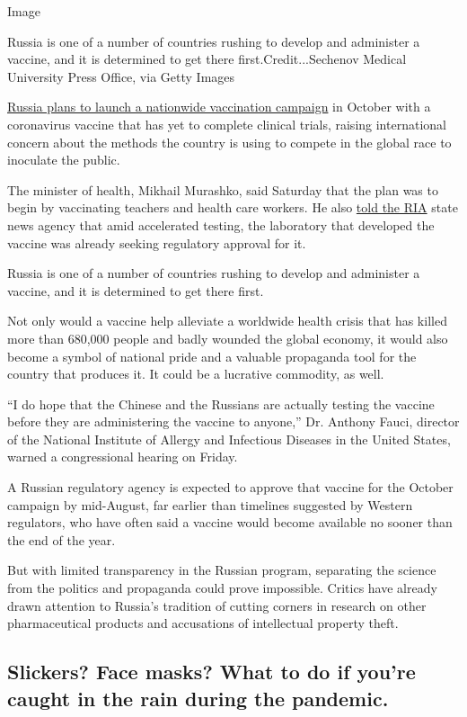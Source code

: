 Image

Russia is one of a number of countries rushing to develop and administer
a vaccine, and it is determined to get there first.Credit...Sechenov
Medical University Press Office, via Getty Images

\href{https://www.nytimes.com/2020/08/02/world/europe/russia-trials-vaccine-October.html}{Russia
plans to launch a nationwide vaccination campaign} in October with a
coronavirus vaccine that has yet to complete clinical trials, raising
international concern about the methods the country is using to compete
in the global race to inoculate the public.

The minister of health, Mikhail Murashko, said Saturday that the plan
was to begin by vaccinating teachers and health care workers. He also
\href{https://ria.ru/20200801/1575248763.html}{told the RIA} state news
agency that amid accelerated testing, the laboratory that developed the
vaccine was already seeking regulatory approval for it.

Russia is one of a number of countries rushing to develop and administer
a vaccine, and it is determined to get there first.

Not only would a vaccine help alleviate a worldwide health crisis that
has killed more than 680,000 people and badly wounded the global
economy, it would also become a symbol of national pride and a valuable
propaganda tool for the country that produces it. It could be a
lucrative commodity, as well.

``I do hope that the Chinese and the Russians are actually testing the
vaccine before they are administering the vaccine to anyone,'' Dr.
Anthony Fauci, director of the National Institute of Allergy and
Infectious Diseases in the United States, warned a congressional hearing
on Friday.

A Russian regulatory agency is expected to approve that vaccine for the
October campaign by mid-August, far earlier than timelines suggested by
Western regulators, who have often said a vaccine would become available
no sooner than the end of the year.

But with limited transparency in the Russian program, separating the
science from the politics and propaganda could prove impossible. Critics
have already drawn attention to Russia's tradition of cutting corners in
research on other pharmaceutical products and accusations of
intellectual property theft.

\hypertarget{slickers-face-masks-what-to-do-if-youre-caught-in-the-rain-during-the-pandemic}{%
\subsection{Slickers? Face masks? What to do if you're caught in the
rain during the
pandemic.}\label{slickers-face-masks-what-to-do-if-youre-caught-in-the-rain-during-the-pandemic}}

